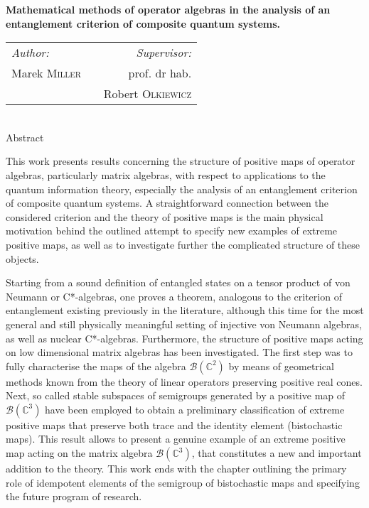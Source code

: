 \thispagestyle{empty}

\begin{center}
{ \large \bfseries
    Mathematical methods of operator algebras
    in the analysis of an entanglement criterion
    of composite quantum systems.
}\\[1.5cm]

{
\begin{tabular}{lcr}
\emph{Author:} & \hspace{3cm} & \emph{Supervisor:}\\
Marek \textsc{Miller} & & prof. dr hab. \\
    & & Robert \textsc{Olkiewicz}
\end{tabular}
}
\\[1cm]
Abstract\\[0.5cm]
\end{center}

{
This work presents results concerning the structure of
positive maps of operator algebras, particularly matrix algebras,
with respect to applications to the quantum information theory,
especially the analysis of an entanglement criterion of composite
quantum systems.
A straightforward connection between the considered criterion
and the theory of positive maps is the main physical motivation
behind the outlined attempt to specify new examples of extreme
positive maps, as well as to investigate further the complicated
structure of these objects.

Starting from a sound definition of entangled states on a tensor product of
von Neumann or C*-algebras,
one proves a theorem, analogous to the criterion of entanglement
existing previously in the literature,
although this time for the most general and still physically meaningful
setting of injective von Neumann algebras,
as well as nuclear C*-algebras.
Furthermore, the structure of positive maps acting on low dimensional
matrix algebras has been investigated.
The first step was to fully characterise the maps of the algebra
$\mathcal{B}(\mathbb{C}^{2})$ by means of geometrical methods known
from the theory of linear operators preserving positive real cones.
Next, so called stable subspaces of semigroups generated by a positive map
of $\mathcal{B}(\mathbb{C}^{3})$ have been employed
to obtain a preliminary classification of extreme positive maps
that preserve both trace and the identity element (bistochastic maps).
This result allows to present a genuine example of an extreme positive
map acting on the matrix algebra $\mathcal{B}(\mathbb{C}^{3})$,
that constitutes a new and important addition to the theory.
This work ends with the chapter outlining the primary role of
idempotent elements of the semigroup of bistochastic maps
and specifying the future program of research.
}
\vfill
